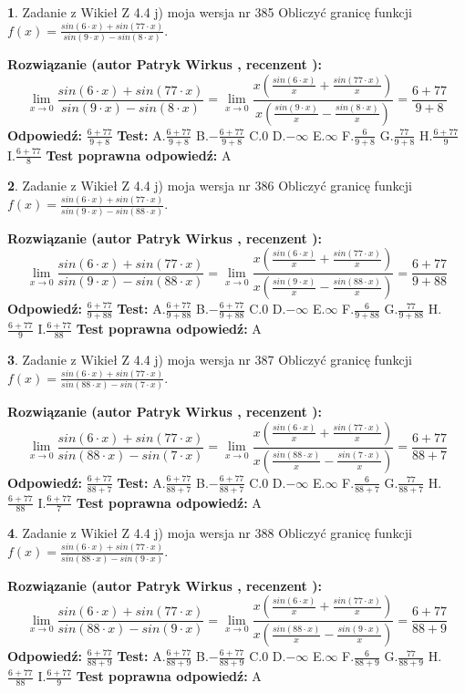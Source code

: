 \documentclass[12pt, a4paper]{article}
\theoremstyle{definition} %
\newtheorem{zad}{}
\newcommand{\zadStart}[1]{\begin{zad}#1\newline}
\newcommand{\zadStop}{\end{zad}}
\newcommand{\rozwStart}[2]{\noindent \textbf{Rozwiązanie (autor #1 , recenzent #2): }\newline}
\newcommand{\rozwStop}{\newline}
\newcommand{\odpStart}{\noindent \textbf{Odpowiedź:}\newline}
\newcommand{\odpStop}{\newline}
\newcommand{\testStart}{\noindent \textbf{Test:}\newline}
\newcommand{\testStop}{\newline}
\newcommand{\kluczStart}{\noindent \textbf{Test poprawna odpowiedź:}\newline}
\newcommand{\kluczStop}{\newline}
\begin{document}
\zadStart{Zadanie z Wikieł Z 4.4 j) moja wersja nr 385}
Obliczyć granicę funkcji $f(x)=\frac{sin(6\cdot x) +sin(77\cdot x)}{sin(9\cdot x) -sin(8\cdot x)}$.
\zadStop
\rozwStart{Patryk Wirkus}{}
$$\lim\limits_{x\to 0}\frac{sin(6\cdot x) +sin(77\cdot x)}{sin(9\cdot x) -sin(8\cdot x)}=\lim\limits_{x\to 0}\frac{x(\frac{sin(6\cdot x)}{x}+\frac{sin(77\cdot x)}{x})}{x(\frac{sin(9\cdot x)}{x}-\frac{sin(8\cdot x)}{x})}=\frac{6+77}{9+8}$$
\rozwStop
\odpStart
$\frac{6+77}{9+8}$
\odpStop
\testStart
A.$\frac{6+77}{9+8}$
B.$-\frac{6+77}{9+8}$
C.$0$
D.$-\infty$
E.$\infty$
F.$\frac{6}{9+8}$
G.$\frac{77}{9+8}$
H.$\frac{6+77}{9}$
I.$\frac{6+77}{8}$
\testStop
\kluczStart
A
\kluczStop



\zadStart{Zadanie z Wikieł Z 4.4 j) moja wersja nr 386}
Obliczyć granicę funkcji $f(x)=\frac{sin(6\cdot x) +sin(77\cdot x)}{sin(9\cdot x) -sin(88\cdot x)}$.
\zadStop
\rozwStart{Patryk Wirkus}{}
$$\lim\limits_{x\to 0}\frac{sin(6\cdot x) +sin(77\cdot x)}{sin(9\cdot x) -sin(88\cdot x)}=\lim\limits_{x\to 0}\frac{x(\frac{sin(6\cdot x)}{x}+\frac{sin(77\cdot x)}{x})}{x(\frac{sin(9\cdot x)}{x}-\frac{sin(88\cdot x)}{x})}=\frac{6+77}{9+88}$$
\rozwStop
\odpStart
$\frac{6+77}{9+88}$
\odpStop
\testStart
A.$\frac{6+77}{9+88}$
B.$-\frac{6+77}{9+88}$
C.$0$
D.$-\infty$
E.$\infty$
F.$\frac{6}{9+88}$
G.$\frac{77}{9+88}$
H.$\frac{6+77}{9}$
I.$\frac{6+77}{88}$
\testStop
\kluczStart
A
\kluczStop



\zadStart{Zadanie z Wikieł Z 4.4 j) moja wersja nr 387}
Obliczyć granicę funkcji $f(x)=\frac{sin(6\cdot x) +sin(77\cdot x)}{sin(88\cdot x) -sin(7\cdot x)}$.
\zadStop
\rozwStart{Patryk Wirkus}{}
$$\lim\limits_{x\to 0}\frac{sin(6\cdot x) +sin(77\cdot x)}{sin(88\cdot x) -sin(7\cdot x)}=\lim\limits_{x\to 0}\frac{x(\frac{sin(6\cdot x)}{x}+\frac{sin(77\cdot x)}{x})}{x(\frac{sin(88\cdot x)}{x}-\frac{sin(7\cdot x)}{x})}=\frac{6+77}{88+7}$$
\rozwStop
\odpStart
$\frac{6+77}{88+7}$
\odpStop
\testStart
A.$\frac{6+77}{88+7}$
B.$-\frac{6+77}{88+7}$
C.$0$
D.$-\infty$
E.$\infty$
F.$\frac{6}{88+7}$
G.$\frac{77}{88+7}$
H.$\frac{6+77}{88}$
I.$\frac{6+77}{7}$
\testStop
\kluczStart
A
\kluczStop



\zadStart{Zadanie z Wikieł Z 4.4 j) moja wersja nr 388}
Obliczyć granicę funkcji $f(x)=\frac{sin(6\cdot x) +sin(77\cdot x)}{sin(88\cdot x) -sin(9\cdot x)}$.
\zadStop
\rozwStart{Patryk Wirkus}{}
$$\lim\limits_{x\to 0}\frac{sin(6\cdot x) +sin(77\cdot x)}{sin(88\cdot x) -sin(9\cdot x)}=\lim\limits_{x\to 0}\frac{x(\frac{sin(6\cdot x)}{x}+\frac{sin(77\cdot x)}{x})}{x(\frac{sin(88\cdot x)}{x}-\frac{sin(9\cdot x)}{x})}=\frac{6+77}{88+9}$$
\rozwStop
\odpStart
$\frac{6+77}{88+9}$
\odpStop
\testStart
A.$\frac{6+77}{88+9}$
B.$-\frac{6+77}{88+9}$
C.$0$
D.$-\infty$
E.$\infty$
F.$\frac{6}{88+9}$
G.$\frac{77}{88+9}$
H.$\frac{6+77}{88}$
I.$\frac{6+77}{9}$
\testStop
\kluczStart
A
\kluczStop
\end{document}
